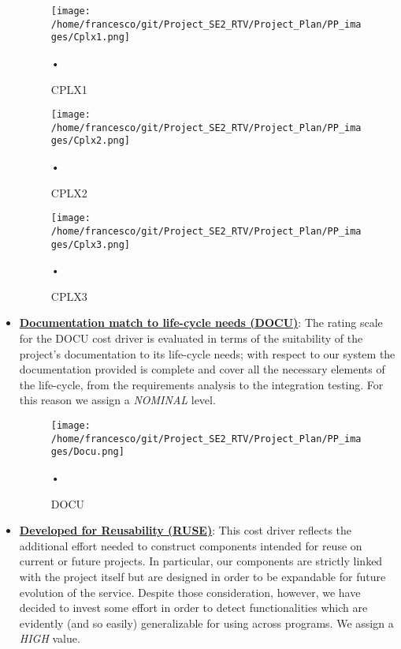\documentclass[10pt, a4paper,titlepage]{article}
\begin{document}
\begin{itemize}
\begin{figure}[h]
\begin{center}
\texttt{[image: /home/francesco/git/Project\_SE2\_RTV/Project\_Plan/PP\_images/Cplx1.png]}
\caption{CPLX1}
\label{fig:CPLX1}
\end{center}•
\end{figure}
\begin{figure}[h]
\begin{center}
\texttt{[image: /home/francesco/git/Project\_SE2\_RTV/Project\_Plan/PP\_images/Cplx2.png]}
\caption{CPLX2}
\label{fig:CPLX2}
\end{center}•
\end{figure}
\begin{figure}[h]
\begin{center}
\texttt{[image: /home/francesco/git/Project\_SE2\_RTV/Project\_Plan/PP\_images/Cplx3.png]}
\caption{CPLX3}
\label{fig:CPLX3}
\end{center}•
\end{figure}
\clearpage
\item \underline{\textbf{Documentation match to life-cycle needs (DOCU)}}: The rating scale for the DOCU cost driver is evaluated in terms of the suitability of the project’s documentation to its life-cycle needs; with respect to our system the documentation provided is complete and cover all the necessary elements of the life-cycle, from the requirements analysis to the integration testing. For this reason we assign a \emph{NOMINAL} level.
\begin{figure}[h]
\begin{center}
\texttt{[image: /home/francesco/git/Project\_SE2\_RTV/Project\_Plan/PP\_images/Docu.png]}
\caption{DOCU}
\label{fig:DOCU}
\end{center}•
\end{figure}
\linebreak
\item \underline{\textbf{Developed for Reusability (RUSE)}}: This cost driver reflects the additional effort needed to construct components intended for reuse on current or future projects. In particular, our components are strictly linked with the project itself but are designed in order to be expandable for future evolution of the service. Despite those consideration, however, we have decided to invest some effort in order to detect functionalities which are evidently (and so easily) generalizable for using across programs. We assign a \emph{HIGH} value.

\end{itemize}
\end{document}
